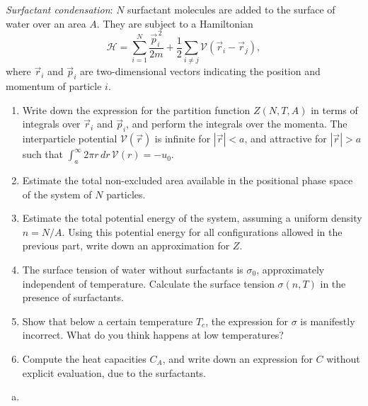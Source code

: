 \begin{problem}
    \textit{Surfactant condensation}: $N$ surfactant molecules are added to the surface of water over an area $A$. They are subject to a Hamiltonian
    \[
        \mathcal{H} = \sum_{i=1}^{N}\frac{\vec{p}_i^{\,2}}{2m} + \frac{1}{2}\sum_{i\neq j}\mathcal{V}(\vec{r}_i - \vec{r}_j),
    \]
    where $\vec{r}_i$ and $\vec{p}_i$ are two-dimensional vectors indicating the position and momentum of particle $i$.

    \begin{enumerate}
        \item[(a)] Write down the expression for the partition function $Z(N,T,A)$ in terms of integrals over $\vec{r}_i$ and $\vec{p}_i$, and perform the integrals over the momenta. The interparticle potential $\mathcal{V}(\vec{r})$ is infinite for $|\vec{r}| < a$, and attractive for $|\vec{r}| > a$ such that $\int_a^\infty 2\pi r\,dr\,\mathcal{V}(r) = -u_0$.

        \item[(b)] Estimate the total non-excluded area available in the positional phase space of the system of $N$ particles.

        \item[(c)] Estimate the total potential energy of the system, assuming a uniform density $n = N/A$. Using this potential energy for all configurations allowed in the previous part, write down an approximation for $Z$.

        \item[(d)] The surface tension of water without surfactants is $\sigma_0$, approximately independent of temperature. Calculate the surface tension $\sigma(n,T)$ in the presence of surfactants.

        \item[(e)] Show that below a certain temperature $T_c$, the expression for $\sigma$ is manifestly incorrect. What do you think happens at low temperatures?

        \item[(f)] Compute the heat capacities $C_A$, and write down an expression for $C$ without explicit evaluation, due to the surfactants.
    \end{enumerate}
\end{problem}

\begin{solution}
    \begin{enumerate}[(a)]
        \item
    \end{enumerate}
\end{solution}

